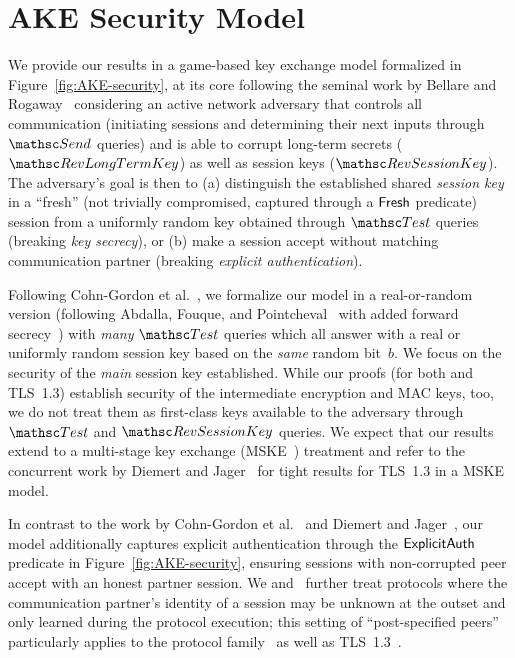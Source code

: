 \section{AKE Security Model}
\label{sec:ake-model}

We provide our results in a game-based key exchange model formalized in Figure~\ref{fig:AKE-security}, at its core following the seminal work by Bellare and Rogaway~\cite{C:BelRog93} considering an active network adversary that controls all communication (initiating sessions and determining their next inputs through $\Send$ queries) and is able to corrupt long-term secrets ($\RevLongTermKey$) as well as session keys ($\RevSessionKey$).
The adversary's goal is then to
(a) distinguish the established shared \emph{session key} in a ``fresh'' (not trivially compromised, captured through a $\mathsf{Fresh}$ predicate) session from a uniformly random key obtained through $\Test$ queries (breaking \emph{key secrecy}),
or (b) make a session accept without matching communication partner (breaking \emph{explicit authentication}).

Following Cohn-Gordon et al.~\cite{C:CCGJJ19}, we formalize our model in a real-or-random version (following Abdalla, Fouque, and Pointcheval~\cite{PKC:AbdFouPoi05} with added forward secrecy~\cite{SP:AbdBenMac15}) with \emph{many} $\Test$ queries which all answer with a real or uniformly random session key based on the \emph{same} random bit~$b$.
We focus on the security of the \emph{main} session key established.
While our proofs (for both \SIGMA and TLS~1.3) establish security of the intermediate encryption and MAC keys, too,
we do not treat them as first-class keys available to the adversary through $\Test$ and $\RevSessionKey$ queries.
We expect that our results extend to a multi-stage key exchange (MSKE~\cite{CCS:FisGue14}) treatment
and refer to the concurrent work by Diemert and Jager~\cite{JC:DieJag20} for tight results for TLS~1.3 in a MSKE model.

In contrast to the work by Cohn-Gordon et al.~\cite{C:CCGJJ19} and Diemert and Jager~\cite{JC:DieJag20}, our model additionally captures explicit authentication through the $\mathsf{ExplicitAuth}$ predicate in Figure~\ref{fig:AKE-security}, ensuring sessions with non-corrupted peer accept with an honest partner session.
We and~\cite{JC:DieJag20} further treat protocols where the communication partner's identity of a session may be unknown at the outset and only learned during the protocol execution; this setting of ``post-specified peers''~\cite{C:CanKra02} particularly applies to the \SIGMA protocol family~\cite{C:Krawczyk03} as well as TLS~1.3~\cite{rfc8446}.


